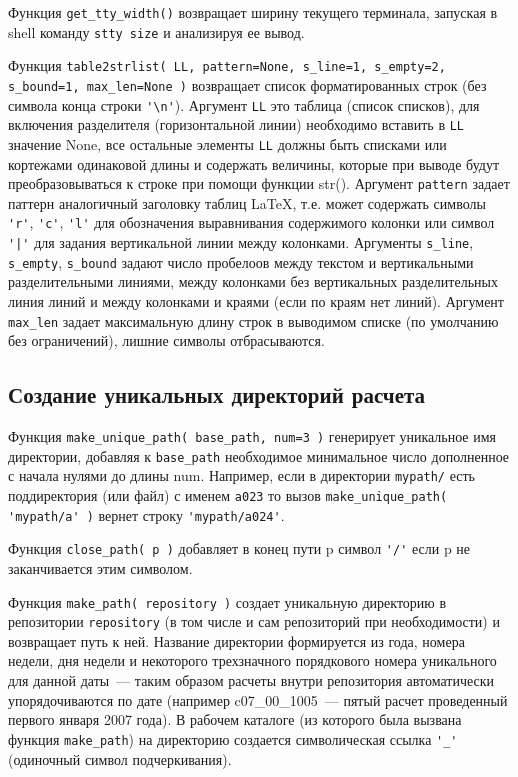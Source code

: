 Функция \verb'get_tty_width()' возвращает ширину текущего терминала, запуская
в {\sf shell} команду \verb'stty size' и анализируя ее вывод.

Функция
\verb'table2strlist( LL, pattern=None, s_line=1, s_empty=2, s_bound=1, max_len=None )'
возвращает список форматированных строк (без символа конца строки
\verb|'\n'|). Аргумент \verb'LL' это таблица (список списков), для включения разделителя
(горизонтальной линии) необходимо вставить в \verb'LL' значение {\sf
  None}, все остальные элементы \verb'LL' должны быть списками или кортежами
одинаковой длины и содержать величины, которые при выводе будут
преобразовываться к строке при помощи функции {\sf str()}. Аргумент
\verb'pattern' задает паттерн аналогичный заголовку таблиц \LaTeX, т.е. может
содержать символы \verb|'r'|, \verb|'c'|, \verb|'l'| для обозначения
выравнивания содержимого колонки или символ \verb-'|'- для задания
вертикальной линии между колонками. Аргументы \verb's_line', \verb's_empty',
\verb's_bound' задают число пробелоов между текстом и вертикальными
разделительными линиями, между колонками без вертикальных разделительных линия
линий и между колонками и краями (если по краям нет линий). Аргумент
\verb'max_len' задает максимальную длину строк в выводимом списке (по
умолчанию без ограничений), лишние символы отбрасываются.



\subsection{Создание уникальных директорий расчета}
Функция  \verb'make_unique_path( base_path, num=3 )' генерирует уникальное имя
директории, добавляя к \verb'base_path' необходимое минимальное число
дополненное с начала нулями до длины {\sf num}. Например, если в директории
\verb'mypath/' есть поддиректория (или файл) с именем \verb'a023' то вызов 
\verb|make_unique_path( 'mypath/a' )| вернет строку \verb|'mypath/a024'|.

Функция \verb'close_path( p )' добавляет в конец пути {\sf p} символ
\verb|'/'| если {\sf p} не заканчивается этим символом.

Функция \verb'make_path( repository )' создает уникальную директорию в
репозитории \verb"repository" (в том числе и сам репозиторий при необходимости) и возвращает путь к ней.
Название директории формируется из
года, номера недели, дня недели и некоторого трехзначного порядкового номера
уникального для данной даты~--- таким образом расчеты внутри
репозитория автоматически
упорядочиваются по дате (например {\sf
  c07\_00\_1005}~--- пятый расчет проведенный первого января 2007
года). 
В рабочем каталоге (из которого была вызвана функция \verb'make_path') на директорию создается
символическая ссылка \verb|'_'| (одиночный символ подчеркивания).


